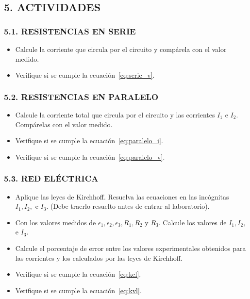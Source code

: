 \documentclass[12pt, a4paper]{article}
\begin{document}
\subsection*{5. ACTIVIDADES}
\subsubsection*{5.1. RESISTENCIAS EN SERIE}
\begin{itemize}
    \item Calcule la corriente que circula por el circuito y compárela con el valor medido.
    \item Verifique si se cumple la ecuación~\eqref{eq:serie_v}.
\end{itemize}

\subsubsection*{5.2. RESISTENCIAS EN PARALELO}
\begin{itemize}
    \item Calcule la corriente total que circula por el circuito y las corrientes $I_1$ e $I_2$. Compárelas con el valor medido.
    \item Verifique si se cumple la ecuación~\eqref{eq:paralelo_i}.
    \item Verifique si se cumple la ecuación~\eqref{eq:paralelo_v}.
\end{itemize}

\subsubsection*{5.3. RED ELÉCTRICA}
\begin{itemize}
    \item Aplique las leyes de Kirchhoff. Resuelva las ecuaciones en las incógnitas $I_1, I_2,$ e $I_3$. 
    (Debe traerlo resuelto antes de entrar al laboratorio).
    \item Con los valores medidos de $\epsilon_1, \epsilon_2, \epsilon_3, R_1, R_2$ y $R_3$. Calcule los 
    valores de $I_1, I_2,$ e $I_3$.
    \item Calcule el porcentaje de error entre los valores experimentales obtenidos para las corrientes y 
    los calculados por las leyes de Kirchhoff.
    \item Verifique si se cumple la ecuación~\eqref{eq:kcl}.
    \item Verifique si se cumple la ecuación~\eqref{eq:kvl}.
\end{itemize}
\end{document}
